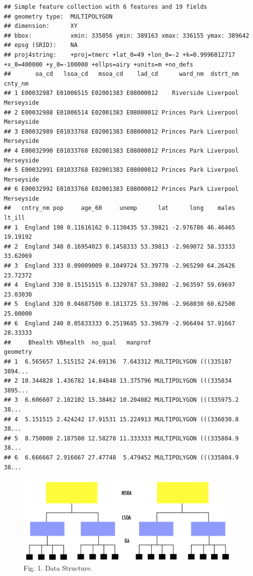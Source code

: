 \documentclass[]{book}
\begin{document}
\begin{verbatim}
## Simple feature collection with 6 features and 19 fields
## geometry type:  MULTIPOLYGON
## dimension:      XY
## bbox:           xmin: 335056 ymin: 389163 xmax: 336155 ymax: 389642
## epsg (SRID):    NA
## proj4string:    +proj=tmerc +lat_0=49 +lon_0=-2 +k=0.9996012717 +x_0=400000 +y_0=-100000 +ellps=airy +units=m +no_defs
##       oa_cd   lsoa_cd   msoa_cd    lad_cd      ward_nm  dstrt_nm    cnty_nm
## 1 E00032987 E01006515 E02001383 E08000012    Riverside Liverpool Merseyside
## 2 E00032988 E01006514 E02001383 E08000012 Princes Park Liverpool Merseyside
## 3 E00032989 E01033768 E02001383 E08000012 Princes Park Liverpool Merseyside
## 4 E00032990 E01033768 E02001383 E08000012 Princes Park Liverpool Merseyside
## 5 E00032991 E01033768 E02001383 E08000012 Princes Park Liverpool Merseyside
## 6 E00032992 E01033768 E02001383 E08000012 Princes Park Liverpool Merseyside
##   cntry_nm pop     age_60     unemp      lat      long    males   lt_ill
## 1  England 198 0.11616162 0.1130435 53.39821 -2.976786 46.46465 19.19192
## 2  England 348 0.16954023 0.1458333 53.39813 -2.969072 58.33333 33.62069
## 3  England 333 0.09009009 0.1049724 53.39778 -2.965290 64.26426 23.72372
## 4  England 330 0.15151515 0.1329787 53.39802 -2.963597 59.69697 23.03030
## 5  England 320 0.04687500 0.1813725 53.39706 -2.968030 60.62500 25.00000
## 6  England 240 0.05833333 0.2519685 53.39679 -2.966494 57.91667 28.33333
##     Bhealth VBhealth  no_qual   manprof                       geometry
## 1  6.565657 1.515152 24.69136  7.643312 MULTIPOLYGON (((335187 3894...
## 2 10.344828 1.436782 14.84848 13.375796 MULTIPOLYGON (((335834 3895...
## 3  6.606607 2.102102 15.38462 10.204082 MULTIPOLYGON (((335975.2 38...
## 4  5.151515 2.424242 17.91531 15.224913 MULTIPOLYGON (((336030.8 38...
## 5  8.750000 2.187500 12.58278 11.333333 MULTIPOLYGON (((335804.9 38...
## 6  6.666667 2.916667 27.47748  5.479452 MULTIPOLYGON (((335804.9 38...
\end{verbatim}

\begin{figure}
\centering
\includegraphics{figs/ch5/datastr.png}
\caption{Fig. 1. Data Structure.}
\end{figure}
\end{document}
